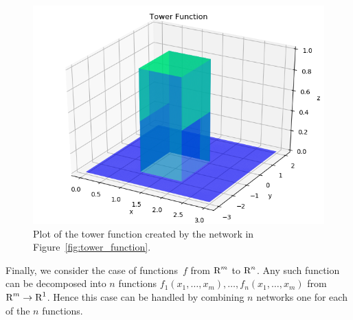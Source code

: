 \begin{figure}[ht]
\begin{center}
\includegraphics[scale=0.5]{TowerFunction.png}
\end{center}
\caption{Plot of the tower function created by the network in Figure~\ref{fig:tower_function}.}
\label{fig:tower_function_plot}
\end{figure}


Finally, we consider the case of functions~$f$ from $\text{R}^m$ to $\text{R}^n$. Any such function can be 
decomposed into $n$ functions $f_1(x_1, \ldots, x_m), \ldots, f_n(x_1, \ldots, x_m)$ 
from $\text{R}^m \to \text{R}^1$. Hence this case can be handled by combining 
$n$ networks one for each of the $n$ functions.  




